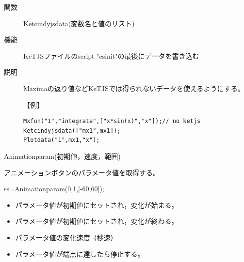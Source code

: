 \documentclass[papersize,a4paper,12pt,uplatex]{jsarticle}
\begin{document}
\begin{description}

\hypertarget{ketcindyjsdata}{}
\item[関数]Ketcindyjsdata(変数名と値のリスト)
\item[機能]KeTJSファイルのscript "csinit"の最後にデータを書き込む
\item[説明]Maximaの返り値などKeTJSでは得られないデータを使えるようにする。

【例】
\begin{verbatim}
Mxfun("1","integrate",["x*sin(x)","x"]);// no ketjs
Ketcindyjsdata(["mx1",mx1]); 
Plotdata("1",mx1,"x");
\end{verbatim}


\end{description}

\begin{description}

\hypertarget{animationparam}{}
\item[関数]Animationparam(初期値，速度，範囲)
\item[機能]アニメーションボタンのパラメータ値を取得する。
\item[例　]ss=Animationparam(0,1,[-60,60]);
\item[説明]\mbox{}

\begin{itemize}
\item {}パラメータ値が初期値にセットされ，変化が始まる。
\item {}パラメータ値が初期値にセットされ，変化が終わる。
\item {}パラメータ値の変化速度（秒速）
\item {}パラメータ値が端点に達したら停止する。
\end{itemize}


\end{description}
\end{document}
